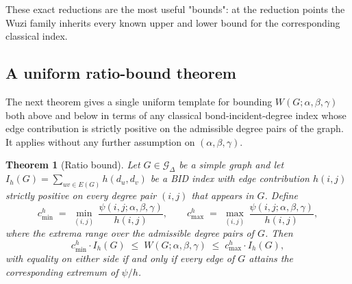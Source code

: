 \documentclass[11pt,a4paper]{article}
\newtheorem{theorem}{Theorem}[section]
\theoremstyle{definition}
\newcommand{\Wuzi}{W(G;\alpha,\beta,\gamma)}
\begin{document}
These exact reductions are the most useful "bounds": at the
reduction points the Wuzi family inherits every known upper and
lower bound for the corresponding classical index.

\subsection{A uniform ratio-bound theorem}\label{sub:ratio}

The next theorem gives a single uniform template for bounding
$\Wuzi$ both above and below in terms of any classical
bond-incident-degree index whose edge contribution is strictly
positive on the admissible degree pairs of the graph. It applies
without any further assumption on $(\alpha, \beta, \gamma)$.

\begin{theorem}[Ratio bound]\label{thm:ratio_bound}
Let $G \in \mathcal{G}_\Delta$ be a simple graph and let
$I_h(G) = \sum_{uv \in E(G)} h(d_u, d_v)$ be a BID index with
edge contribution $h(i, j)$ strictly positive on every degree
pair $(i, j)$ that appears in $G$. Define
\[
c_{\min}^{h} \;=\; \min_{(i, j)}\,\frac{\psi(i, j;\alpha,\beta,\gamma)}{h(i, j)},
\qquad
c_{\max}^{h} \;=\; \max_{(i, j)}\,\frac{\psi(i, j;\alpha,\beta,\gamma)}{h(i, j)},
\]
where the extrema range over the admissible degree pairs of $G$.
Then
\begin{equation}\label{eq:ratio_bound}
c_{\min}^{h} \cdot I_h(G) \;\le\; \Wuzi \;\le\; c_{\max}^{h} \cdot I_h(G),
\end{equation}
with equality on either side if and only if every edge of $G$
attains the corresponding extremum of $\psi/h$.
\end{theorem}
\end{document}

